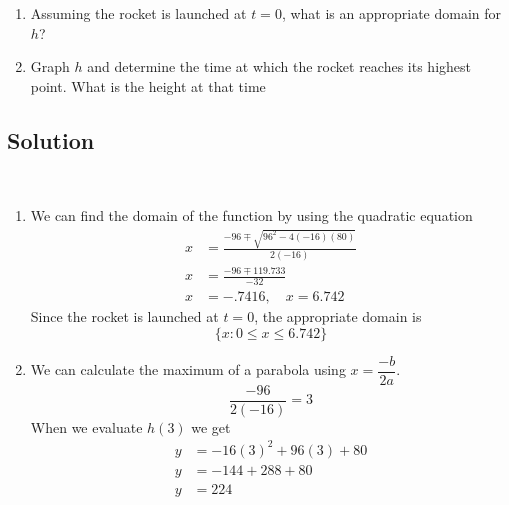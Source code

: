 \documentclass{article}
\newcommand{\solution}{\subsection*{Solution}}
\begin{document}
\begin{enumerate}[label=\textbf{\alph*. }]
\item Assuming the rocket is launched at $t = 0$, what is an appropriate domain for $h$?
\item Graph $h$ and determine the time at which the rocket reaches its highest point. What is the
  height at that time
\end{enumerate}

\solution\
\begin{enumerate}[label=\textbf{\alph*. }]
\item
  We can find the domain of the function by using the quadratic equation
  \[
    \begin{split}
      x &= \frac{-96 \mp \sqrt{96^2 - 4(-16)(80)}}{2(-16)} \\
      x &= \frac{-96 \mp 119.733}{-32} \\
      x &= -.7416, \quad x = 6.742
    \end{split}
  \]
  Since the rocket is launched at $t=0$, the appropriate domain is
  \[
    \{x: 0 \leq x \leq 6.742 \}
  \]
\pagebreak
\item
\begin{multicols}{2}
  We can calculate the maximum of a parabola using $x = \dfrac{-b}{2a}$.
  \[
    \frac{-96}{2(-16)} = 3
  \]
  When we evaluate $h(3)$ we get
  \[
  \begin{split}
    y &= -16{(3)}^2 + 96(3) + 80 \\
    y &= -144 + 288 + 80 \\
    y &= 224
  \end{split}
  \]
\columnbreak\
\begin{figure}[H]
\end{figure}
\end{multicols}
\end{enumerate}
\end{document}

